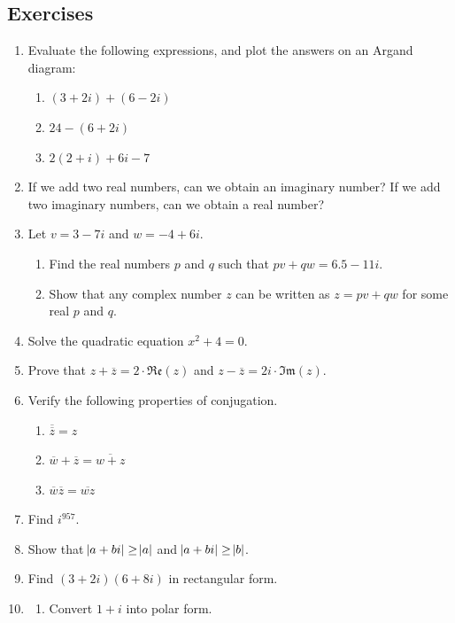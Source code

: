 \documentclass[a4paper,10pt,titlepage]{article}
\theoremstyle{definition}
\newcommand*\realp[1]{ \mathfrak{Re} \left ( {#1} \right )  }
\newcommand*\imagp[1]{ \mathfrak{Im} \left ( {#1} \right )  }
\begin{document}
\subsection*{Exercises}
\begin{enumerate}
  \item Evaluate the following expressions, and plot the answers on an Argand diagram:
        \begin{enumerate}
          \item $ (3+2i) + (6-2i) $
          \item $ 24 - (6 + 2i) $
          \item $ 2(2+i) + 6i - 7 $
        \end{enumerate}
  \item If we add two real numbers, can we obtain an imaginary number? If we add two
        imaginary numbers, can we obtain a real number?
  \item Let $ v = 3-7i $ and $ w = -4+6i $.
    \begin{enumerate}
      \item Find the real numbers $ p $ and $ q $ such that $ pv + qw = 6.5 - 11i $.
      \item Show that any complex number $ z $ can be written as $ z = pv + qw $ for some real $ p $ and $ q $.
    \end{enumerate}
  \item Solve the quadratic equation $ x^2 + 4 = 0 $.
  \item Prove that $ z + \overline z = 2 \cdot \realp{z} $ and $ z - \overline z = 2i \cdot \imagp{z} $. \label{ex:reflecsum}
  \item Verify the following properties of conjugation.
    \begin{enumerate}
      \item $ \overline {\overline z} = z $
      \item $ \overline w + \overline z = \overline{w + z} $
      \item $ \overline w \overline z = \overline{wz} $
    \end{enumerate}
  \item Find $ i^{957} $.
  \item Show that $ \abs{a + bi} \geq \abs{a} $ and $ \abs{a + bi} \geq \abs{b} $.
  \item Find $ (3 + 2i)(6 + 8i) $ in rectangular form.
  \item \begin{enumerate}
          \item Convert $ 1 + i $ into polar form.

\end{enumerate}
\end{enumerate}
\end{document}
